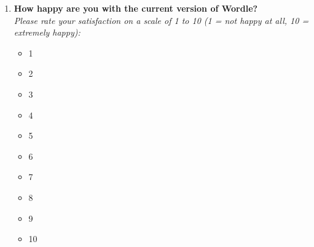 \begin{enumerate}
    \item \textbf{How happy are you with the current version of Wordle?} \\
    \textit{Please rate your satisfaction on a scale of 1 to 10 (1 = not happy at all, 10 = extremely happy):}
    \begin{itemize}
        \item 1
        \item 2
        \item 3
        \item 4
        \item 5
        \item 6
        \item 7
        \item 8
        \item 9
        \item 10
    \end{itemize}

\end{enumerate}

